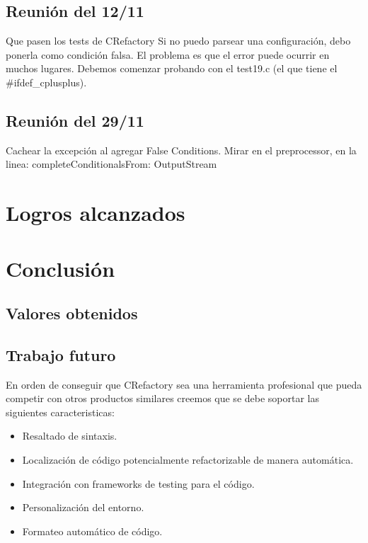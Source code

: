 \documentclass[a4paper,oneside,10pt]{article}
\begin{document}
\subsection{Reunión del 12/11}
Que pasen los tests de CRefactory
Si no puedo parsear una configuración, debo ponerla como condición falsa.  El problema es que el error puede ocurrir en muchos lugares.  Debemos comenzar probando con el test19.c (el que tiene el \#ifdef\_cplusplus).

\subsection{Reunión del 29/11}
Cachear la excepción al agregar False Conditions. Mirar en el preprocessor, en la linea: completeConditionalsFrom: OutputStream


\section{Logros alcanzados}

\section{Conclusi\'on}

\subsection{Valores obtenidos}
\subsection{Trabajo futuro}
En orden de conseguir que CRefactory sea una herramienta profesional que pueda competir con otros productos similares creemos que se debe soportar las siguientes caracteristicas:
\begin{itemize}
	\item Resaltado de sintaxis.
	\item Localizaci\'on de c\'odigo potencialmente refactorizable de manera autom\'atica.
	\item Integraci\'on con frameworks de testing para el c\'odigo.
	\item Personalizaci\'on del entorno.
	\item Formateo autom\'atico de c\'odigo.
\end{itemize}
\end{document}
